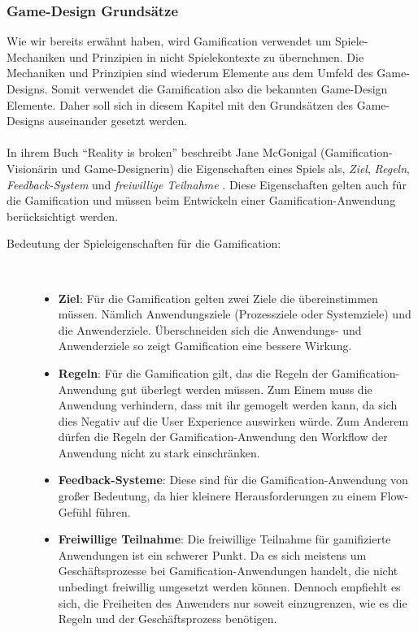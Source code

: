 \documentclass[a4paper,12pt]{scrartcl}
\begin{document}
\subsubsection{Game-Design Grundsätze}
Wie wir bereits erwähnt haben, wird Gamification verwendet um Spiele-Mechaniken und Prinzipien in nicht Spielekontexte zu übernehmen. Die Mechaniken und Prinzipien sind wiederum Elemente aus dem Umfeld des Game-Designs. Somit verwendet die Gamification also die bekannten Game-Design Elemente. Daher soll sich in diesem Kapitel mit den Grundsätzen des Game-Designs auseinander gesetzt werden.
\\\\
In ihrem Buch \enquote{Reality is broken} beschreibt Jane McGonigal (Gamification-Visionärin und Game-Designerin) die Eigenschaften eines Spiels als, \textit{Ziel}, \textit{Regeln}, \textit{Feedback-System} und \textit{freiwillige Teilnahme} \cite{Mcgonigal2011}. Diese Eigenschaften gelten auch für die Gamification und müssen beim Entwickeln einer Gamification-Anwendung berücksichtigt werden.
\begin{description}
   \item[Bedeutung der Spieleigenschaften für die Gamification:]~\par
   \begin{itemize}
      \item \textbf{Ziel}: Für die Gamification gelten zwei Ziele die übereinstimmen müssen. Nämlich Anwendungsziele (Prozessziele oder Systemziele) und die Anwenderziele. Überschneiden sich die Anwendungs- und Anwenderziele so zeigt Gamification eine bessere Wirkung. 
      \item \textbf{Regeln}: Für die Gamification gilt, das die Regeln der Gamification-Anwendung gut überlegt werden müssen. Zum Einem muss die Anwendung verhindern, dass mit ihr gemogelt werden kann, da sich dies Negativ auf die User Experience auswirken würde. Zum Anderem dürfen die Regeln der Gamification-Anwendung den Workflow der Anwendung nicht zu stark einschränken.
      \item \textbf{Feedback-Systeme}: Diese sind für die Gamification-Anwendung von großer Bedeutung, da hier kleinere Herausforderungen zu einem Flow-Gefühl führen.
      \item \textbf{Freiwillige Teilnahme}: Die freiwillige Teilnahme für gamifizierte Anwendungen ist ein schwerer Punkt. Da es sich meistens um Geschäftsprozesse bei Gamification-Anwendungen handelt, die nicht unbedingt freiwillig umgesetzt werden können. Dennoch empfiehlt es sich, die Freiheiten des Anwenders nur soweit einzugrenzen, wie es die Regeln und der Geschäftsprozess benötigen. 
   \end{itemize}
\end{description}
\end{document}
